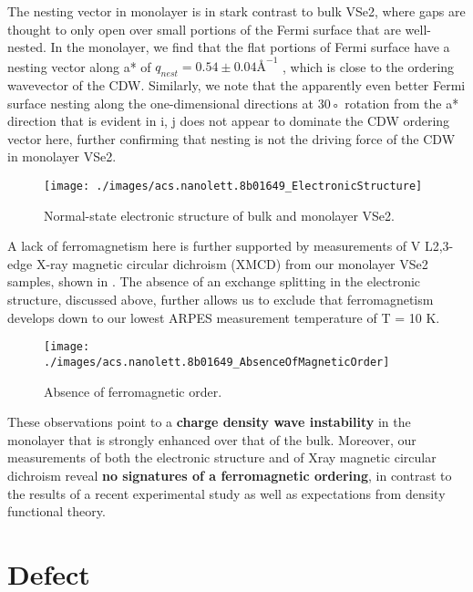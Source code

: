 The nesting vector in monolayer is in stark contrast to bulk VSe2, where gaps are thought to only open over small portions of the Fermi surface that are well-nested. In the monolayer, we find that the flat portions of Fermi surface have a nesting vector along a* of $q_{nest} = 0.54 ± 0.04 Å^{-1}$ , which is close to the ordering wavevector of the CDW. Similarly, we note that the apparently even better Fermi surface nesting along the one-dimensional directions at 30◦ rotation from the a* direction that is evident in i, j does not appear to dominate the CDW ordering vector here, further confirming that nesting is not the driving force of the CDW in monolayer VSe2.
\begin{figure}[ht] 
    \texttt{[image: ./images/acs.nanolett.8b01649\_ElectronicStructure]}
	\caption[Normal-state electronic structure of bulk and monolayer VSe2]{
		Normal-state electronic structure of bulk and monolayer VSe2.
	}
\end{figure}

A lack of ferromagnetism here is further supported by measurements of V L2,3-edge X-ray magnetic circular dichroism (XMCD) from our monolayer VSe2 samples, shown in . The absence of an exchange splitting in the electronic structure, discussed above, further allows us to exclude that ferromagnetism develops down to our lowest ARPES measurement temperature of T = 10 K.

\begin{figure}[ht] 
    \texttt{[image: ./images/acs.nanolett.8b01649\_AbsenceOfMagneticOrder]}
	\caption[Absence of ferromagnetic order]{
		Absence of ferromagnetic order.
	}
\end{figure}

These observations point to a \textbf{charge density wave instability} in the monolayer that is strongly enhanced over that of the bulk. Moreover, our measurements of both the electronic structure and of Xray magnetic circular dichroism reveal \textbf{no signatures of a ferromagnetic ordering}, in contrast to the results of a recent experimental study as well as expectations from density functional theory.

\section{Defect}

